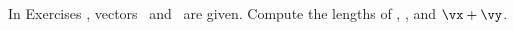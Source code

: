 {\noin In Exercises}
{, vectors \vx\ and \vy\ are given. Compute the lengths of \vx, \vy, and $\vx+\vy$. }
